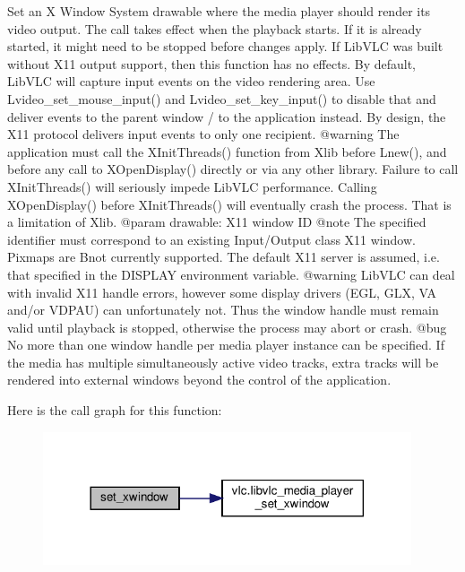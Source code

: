 \begin{DoxyVerb}Set an X Window System drawable where the media player should render its
video output. The call takes effect when the playback starts. If it is
already started, it might need to be stopped before changes apply.
If LibVLC was built without X11 output support, then this function has no
effects.
By default, LibVLC will capture input events on the video rendering area.
Use L{video_set_mouse_input}() and L{video_set_key_input}() to
disable that and deliver events to the parent window / to the application
instead. By design, the X11 protocol delivers input events to only one
recipient.
@warning
The application must call the XInitThreads() function from Xlib before
L{new}(), and before any call to XOpenDisplay() directly or via any
other library. Failure to call XInitThreads() will seriously impede LibVLC
performance. Calling XOpenDisplay() before XInitThreads() will eventually
crash the process. That is a limitation of Xlib.
@param drawable: X11 window ID @note The specified identifier must correspond to an existing Input/Output class X11 window. Pixmaps are B{not} currently supported. The default X11 server is assumed, i.e. that specified in the DISPLAY environment variable. @warning LibVLC can deal with invalid X11 handle errors, however some display drivers (EGL, GLX, VA and/or VDPAU) can unfortunately not. Thus the window handle must remain valid until playback is stopped, otherwise the process may abort or crash.
@bug No more than one window handle per media player instance can be specified. If the media has multiple simultaneously active video tracks, extra tracks will be rendered into external windows beyond the control of the application.
\end{DoxyVerb}
 Here is the call graph for this function\+:
\nopagebreak
\begin{figure}[H]
\begin{center}
\leavevmode
\includegraphics[width=308pt]{classvlc_1_1_media_player_aef02cae4b8abcf9618bfd14e5af73c07_cgraph}
\end{center}
\end{figure}
\mbox{\label{classvlc_1_1_media_player_a26ca7c1c7fcdd35378e7be97727047a6}} 
